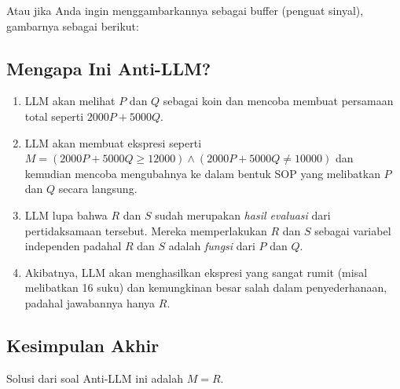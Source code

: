 \documentclass[12pt,a4paper]{article}
\begin{document}
Atau jika Anda ingin menggambarkannya sebagai buffer (penguat sinyal), gambarnya sebagai berikut:

\begin{center}
\end{center}

\subsection*{Mengapa Ini Anti-LLM?}
\begin{enumerate}
    \item LLM akan melihat $P$ dan $Q$ sebagai koin dan mencoba membuat persamaan total seperti $2000P + 5000Q$.
    \item LLM akan membuat ekspresi seperti $M = (2000P+5000Q \ge 12000) \land (2000P+5000Q \ne 10000)$ dan kemudian mencoba mengubahnya ke dalam bentuk SOP yang melibatkan $P$ dan $Q$ secara langsung.
    \item LLM lupa bahwa $R$ dan $S$ sudah merupakan \emph{hasil evaluasi} dari pertidaksamaan tersebut. Mereka memperlakukan $R$ dan $S$ sebagai variabel independen padahal $R$ dan $S$ adalah \emph{fungsi} dari $P$ dan $Q$.
    \item Akibatnya, LLM akan menghasilkan ekspresi yang sangat rumit (misal melibatkan 16 suku) dan kemungkinan besar salah dalam penyederhanaan, padahal jawabannya hanya $R$.
\end{enumerate}

\subsection*{Kesimpulan Akhir}
Solusi dari soal Anti-LLM ini adalah $\boxed{M = R}$. 
\end{document}
